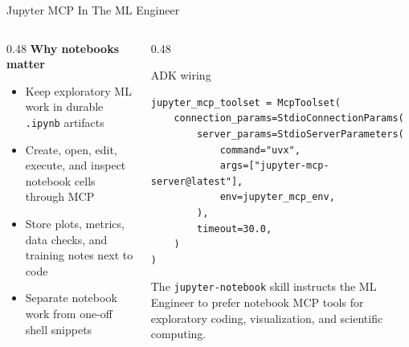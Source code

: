 \documentclass[aspectratio=169]{beamer}
\begin{document}
\begin{frame}[fragile]{Jupyter MCP In The ML Engineer}
  \begin{columns}[T,onlytextwidth]
    \begin{column}{0.48\textwidth}
      \small
      \textbf{Why notebooks matter}
      \vspace{0.12cm}
      \begin{itemize}
        \item Keep exploratory ML work in durable \texttt{.ipynb} artifacts
        \item Create, open, edit, execute, and inspect notebook cells through MCP
        \item Store plots, metrics, data checks, and training notes next to code
        \item Separate notebook work from one-off shell snippets
      \end{itemize}
    \end{column}
    \begin{column}{0.48\textwidth}
      \begin{block}{ADK wiring}
\begin{lstlisting}[style=slidecode]
jupyter_mcp_toolset = McpToolset(
    connection_params=StdioConnectionParams(
        server_params=StdioServerParameters(
            command="uvx",
            args=["jupyter-mcp-server@latest"],
            env=jupyter_mcp_env,
        ),
        timeout=30.0,
    )
)
\end{lstlisting}
      \end{block}
      \vspace{0.05cm}
      {\scriptsize\color{tamugray}The \texttt{jupyter-notebook} skill instructs
      the ML Engineer to prefer notebook MCP tools for exploratory coding,
      visualization, and scientific computing.}
    \end{column}
  \end{columns}
\end{frame}
\end{document}
